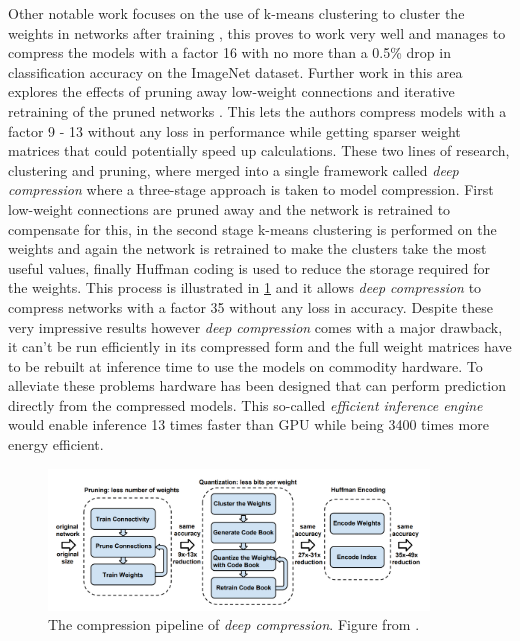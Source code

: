 \documentclass{kththesis}
\newcommand{\bibentry}[1]{\parencite{#1}}
\begin{document}
Other notable work focuses on the use of k-means clustering to cluster the
weights in networks after training \bibentry{gong2014compressing}, this proves
to work very well and manages to compress the models with a factor 16 with no
more than a 0.5\% drop in classification accuracy on the ImageNet dataset.
Further work in this area explores the effects of pruning away low-weight
connections and iterative retraining of the pruned networks
\bibentry{han2015learning}. This lets the authors compress models with a factor
9 - 13 without any loss in performance while getting sparser weight matrices
that could potentially speed up calculations. These two lines of research,
clustering and pruning, where merged into a single framework called \emph{deep
  compression} \bibentry{han2015deep} where a three-stage approach is taken to
model compression. First low-weight connections are pruned away and the network
is retrained to compensate for this, in the second stage k-means clustering is
performed on the weights and again the network is retrained to make the clusters
take the most useful values, finally Huffman coding
\bibentry{van1976construction} is used to reduce the storage required for the
weights. This process is illustrated in \cref{fig:DeepCompression} and it allows \emph{deep compression} to compress networks with a
factor 35 without any loss in accuracy. Despite these very impressive results
however \emph{deep compression} comes with a major drawback, it can't be run
efficiently in its compressed form and the full weight matrices have to be
rebuilt at inference time to use the models on commodity hardware. To alleviate
these problems hardware has been designed that can perform prediction directly
from the compressed models. This so-called \emph{efficient inference engine}
\bibentry{han2016eie} would enable inference 13 times faster than GPU while
being 3400 times more energy efficient.  

\begin{figure}[h]
  \centering
  \includegraphics[width=0.9\textwidth]{DeepCompression}
  \caption{The compression pipeline of \textit{deep compression}. Figure from \textcite[]{han2015deep}.}
  \label{fig:DeepCompression}
  \end{figure}
\end{document}
